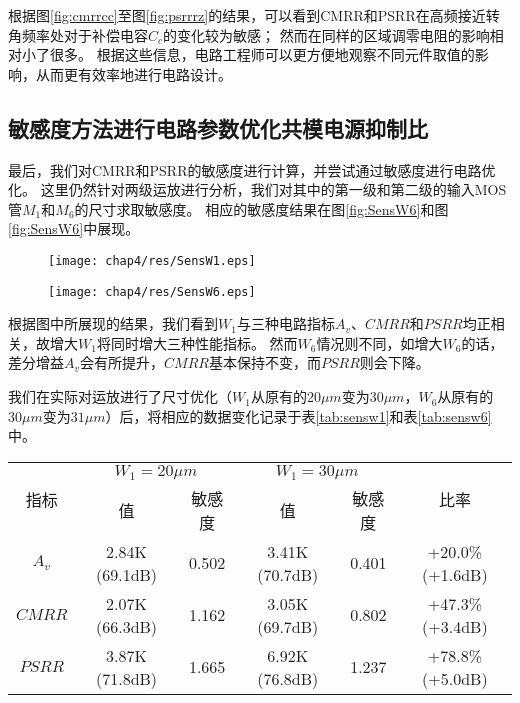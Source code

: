 根据图\ref{fig:cmrrcc}至图\ref{fig:psrrrz}的结果，可以看到CMRR和PSRR在高频接近转角频率处对于补偿电容$C_c$的变化较为敏感；
然而在同样的区域调零电阻的影响相对小了很多。
根据这些信息，电路工程师可以更方便地观察不同元件取值的影响，从而更有效率地进行电路设计。

\fi

\subsection{敏感度方法进行电路参数优化共模电源抑制比}

最后，我们对CMRR和PSRR的敏感度进行计算，并尝试通过敏感度进行电路优化。
这里仍然针对两级运放进行分析，我们对其中的第一级和第二级的输入MOS管$M_1$和$M_6$的尺寸求取敏感度。
相应的敏感度结果在图\ref{fig:SensW6}和图\ref{fig:SensW6}中展现。

\begin{figure}[!htp]
	\centering
	\texttt{[image: chap4/res/SensW1.eps]}
\end{figure}

\begin{figure}[!htp]
	\centering
	\texttt{[image: chap4/res/SensW6.eps]}
\end{figure}

根据图中所展现的结果，我们看到$W_1$与三种电路指标$A_v$、$CMRR$和$PSRR$均正相关，故增大$W_1$将同时增大三种性能指标。
然而$W_6$情况则不同，如增大$W_6$的话，差分增益$A_v$会有所提升，$CMRR$基本保持不变，而$PSRR$则会下降。

我们在实际对运放进行了尺寸优化（$W_1$从原有的$20\mu m$变为$30\mu m$，$W_6$从原有的$30\mu m$变为$31\mu m$）后，将相应的数据变化记录于表\ref{tab:sensw1}和表\ref{tab:sensw6}中。

\begin{table}[!htp]
	\centering
	\begin{tabular}{c|c|c|c|c|c}
		\hline
		\multirow{2}{*}{指标} & \multicolumn{2}{c|}{$W_1=20\mu m$} & \multicolumn{2}{c|}{$W_1=30\mu m$} & \multirow{2}{*}{比率} \\ \cline{2-5}
		                    &       值        &        敏感度        &       值        &        敏感度        &  \\ \hline
		       $A_v$        & 2.84K (69.1dB) &       0.502       & 3.41K (70.7dB) &       0.401       &  +20.0\% (+1.6dB)   \\ \hline
		      $CMRR$        & 2.07K (66.3dB) &       1.162       & 3.05K (69.7dB) &       0.802       &  +47.3\% (+3.4dB)   \\ \hline
		      $PSRR$        & 3.87K (71.8dB) &       1.665       & 6.92K (76.8dB) &       1.237       &  +78.8\% (+5.0dB)   \\ \hline
	\end{tabular}
\end{table}

